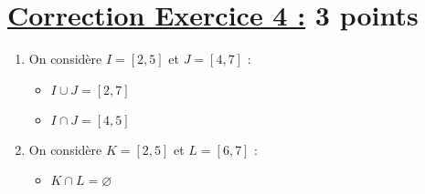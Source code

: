 \documentclass[12pt,a4paper]{article}
\begin{document}
\section*{\underline{Correction Exercice 4 :} 3 points}
\begin{enumerate}
    \item On considère $I = [2, 5]$ et $J = [4, 7]$ :
    \begin{itemize}
        \item $I \cup J = [2, 7]$
        \item $I \cap J = [4, 5]$
    \end{itemize}

    \item On considère $K = [2, 5]$ et $L = [6, 7]$ :
    \begin{itemize}
        \item $K \cap L = \varnothing$
    \end{itemize}
\end{enumerate}
\end{document}
